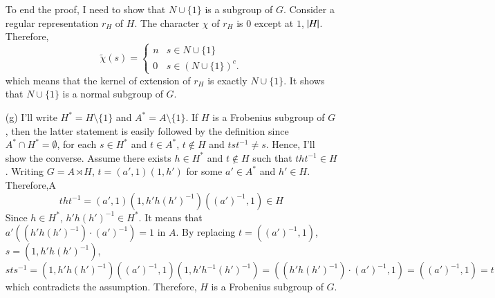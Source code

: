 \documentclass[a4paper, 12pt]{article}
\theoremstyle{Mydefinition}
\theoremstyle{Mytheorem}
\begin{document}
\begin{enumerate}
    To end the proof, I need to show that $N\cup \{1\}$ is a subgroup of $G$. Consider a regular representation $r_H$ of $H$. The character $\chi$ of $r_H$ is $0$ except at $1$, $\abs{H}$. Therefore,
    \begin{equation}
        \tilde{\chi}(s) = \begin{cases}
        n & s\in N\cup \{1\}\\
        0 & s\in (N\cup \{1\})^c.
        \end{cases}
    \end{equation}
    which means that the kernel of extension of $r_H$ is exactly $N\cup \{1\}$. It shows that $N\cup \{1\}$ is a normal subgroup of $G$.
    \item[(g)] I'll write $H^* = H\setminus\{1\}$ and $A^* = A\setminus \{1\}$. If $H$ is a Frobenius subgroup of $G$, then the latter statement is easily followed by the definition since $A^*\cap H^* = \emptyset$, for each $s\in H^*$ and $t\in A^*$, $t\not\in H$ and $tst^{-1}\neq s$. Hence, I'll show the converse. Assume there exists $h\in H^*$ and $t\not\in H$ such that $tht^{-1}\in H$. Writing $G = A\rtimes H$, $t = (a',1)(1,h')$ for some $a'\in A^*$ and $h'\in H$. Therefore,A
    \begin{equation}
        tht^{-1} = (a', 1)(1,h'h(h')^{-1})((a')^{-1}, 1)\in H
    \end{equation}
    Since $h\in H^*$, $h'h(h')^{-1}\in H^*$. It means that $a'((h'h(h')^{-1})\cdot (a')^{-1}) = 1$ in $A$. By replacing $t = ((a')^{-1},1)$, $s = (1,h'h(h')^{-1})$,
    \begin{equation}
        sts^{-1} = (1,h'h(h')^{-1})((a')^{-1},1)(1,h'h^{-1}(h')^{-1}) = ((h'h(h')^{-1})\cdot (a')^{-1}, 1) = ((a')^{-1}, 1) = t
    \end{equation}
    which contradicts the assumption. Therefore, $H$ is a Frobenius subgroup of $G$.
\end{enumerate}
\end{document}
